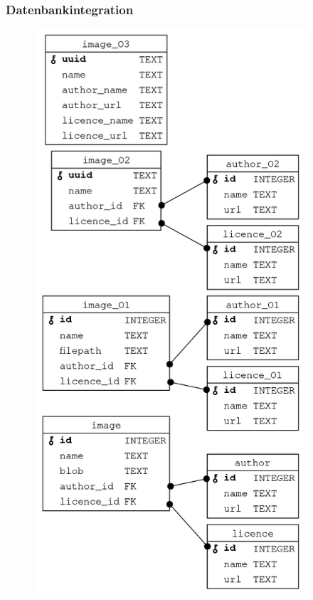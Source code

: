 \cleardoublepage
\subsubsection{Datenbankintegration}

\begin{figure}
  \centering
  \includegraphics[height=21cm]{images/image_database_schemas.png}
\end{figure}

